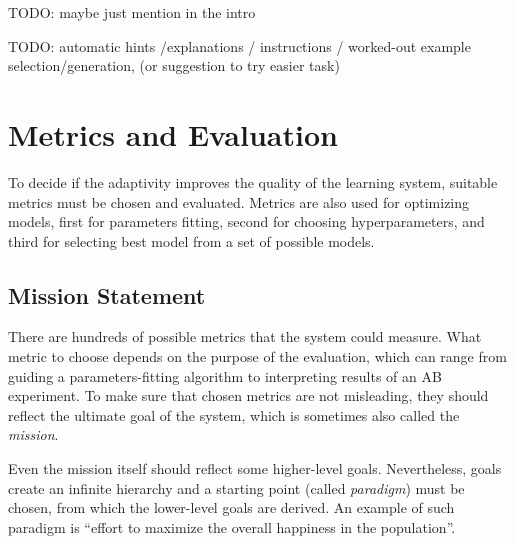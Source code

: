 TODO: maybe just mention in the intro

TODO: automatic hints /explanations / instructions / worked-out example selection/generation,
  (or suggestion to try easier task)


\section{Metrics and Evaluation}
\label{sec:metrics-and-evaluation}


To decide if the adaptivity improves the quality of the learning system,
  suitable metrics must be chosen and evaluated.
Metrics are also used for optimizing models,
  first for parameters fitting, second for choosing hyperparameters,
  and third for selecting best model from a set of possible models.


\subsection{Mission Statement}
\label{sec:mission}

There are hundreds of possible metrics that the system could measure.
What metric to choose depends on the purpose of the evaluation,
  which can range from guiding a parameters-fitting algorithm
  to interpreting results of an AB experiment.
To make sure that chosen metrics are not misleading,
  they should reflect the ultimate goal of the system,
  which is sometimes also called the \emph{mission}.

Even the mission itself should reflect some higher-level goals.
Nevertheless, goals create an infinite hierarchy
  and a starting point (called \emph{paradigm}) must be chosen,
  from which the lower-level goals are derived.
An example of such paradigm is
  ``effort to maximize the overall happiness in the population''.


